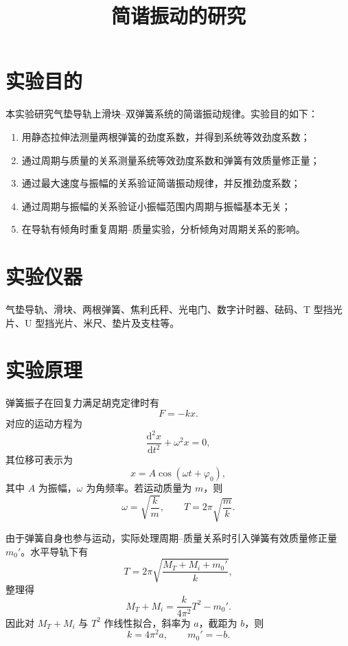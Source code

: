 \documentclass[UTF8,zihao=-4]{ctexart}
\title{\bfseries 简谐振动的研究}
\author{}
\date{}
\begin{document}
\pagestyle{plain}
\maketitle
\vspace{-2.0em}

\section{实验目的}
本实验研究气垫导轨上滑块--双弹簧系统的简谐振动规律。实验目的如下：
\begin{enumerate}[leftmargin=3em]
  \item 用静态拉伸法测量两根弹簧的劲度系数，并得到系统等效劲度系数；
  \item 通过周期与质量的关系测量系统等效劲度系数和弹簧有效质量修正量；
  \item 通过最大速度与振幅的关系验证简谐振动规律，并反推劲度系数；
  \item 通过周期与振幅的关系验证小振幅范围内周期与振幅基本无关；
  \item 在导轨有倾角时重复周期--质量实验，分析倾角对周期关系的影响。
\end{enumerate}

\section{实验仪器}
气垫导轨、滑块、两根弹簧、焦利氏秤、光电门、数字计时器、砝码、T 型挡光片、U 型挡光片、米尺、垫片及支柱等。

\section{实验原理}
弹簧振子在回复力满足胡克定律时有
\begin{equation}
  F=-kx .
\end{equation}
对应的运动方程为
\begin{equation}
  \frac{\mathrm{d}^2x}{\mathrm{d}t^2}+\omega^2x=0,
\end{equation}
其位移可表示为
\begin{equation}
  x=A\cos(\omega t+\varphi_0),
\end{equation}
其中 $A$ 为振幅，$\omega$ 为角频率。若运动质量为 $m$，则
\begin{equation}
  \omega=\sqrt{\frac{k}{m}},\qquad T=2\pi\sqrt{\frac{m}{k}} .
\end{equation}

由于弹簧自身也参与运动，实际处理周期--质量关系时引入弹簧有效质量修正量 $m_0'$。水平导轨下有
\begin{equation}
  T=2\pi\sqrt{\frac{M_T+M_i+m_0'}{k}},
\end{equation}
整理得
\begin{equation}
  M_T+M_i=\frac{k}{4\pi^2}T^2-m_0' .
\end{equation}
因此对 $M_T+M_i$ 与 $T^2$ 作线性拟合，斜率为 $a$，截距为 $b$，则
\begin{equation}
  k=4\pi^2a,\qquad m_0'=-b .
\end{equation}
\end{document}
